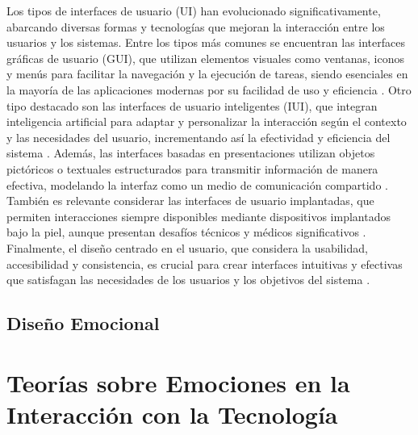 Los tipos de interfaces de usuario (UI) han evolucionado significativamente, abarcando diversas formas y tecnologías que mejoran la interacción entre los usuarios y los sistemas. Entre los tipos más comunes se encuentran las interfaces gráficas de usuario (GUI), que utilizan elementos visuales como ventanas, iconos y menús para facilitar la navegación y la ejecución de tareas, siendo esenciales en la mayoría de las aplicaciones modernas por su facilidad de uso y eficiencia \cite{yen_user_1998}. Otro tipo destacado son las interfaces de usuario inteligentes (IUI), que integran inteligencia artificial para adaptar y personalizar la interacción según el contexto y las necesidades del usuario, incrementando así la efectividad y eficiencia del sistema \cite{goncalves_systematic_2019}. Además, las interfaces basadas en presentaciones utilizan objetos pictóricos o textuales estructurados para transmitir información de manera efectiva, modelando la interfaz como un medio de comunicación compartido \cite{ciccarelli_presentation_1981}. También es relevante considerar las interfaces de usuario implantadas, que permiten interacciones siempre disponibles mediante dispositivos implantados bajo la piel, aunque presentan desafíos técnicos y médicos significativos \cite{holz_implanted_2012}. Finalmente, el diseño centrado en el usuario, que considera la usabilidad, accesibilidad y consistencia, es crucial para crear interfaces intuitivas y efectivas que satisfagan las necesidades de los usuarios y los objetivos del sistema \cite{cherry_designing_1992}.

\subsection{Diseño Emocional}

\section{Teorías sobre Emociones en la Interacción con la Tecnología}

